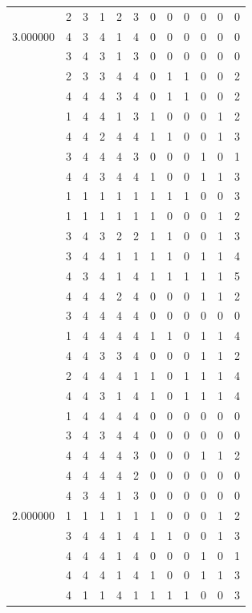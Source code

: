 \documentclass[]{book}
\theoremstyle{definition}
\theoremstyle{definition}
\theoremstyle{definition}
\theoremstyle{remark}
\begin{document}
\begin{table}
{\begin{tabular}[t]{rrrrrrrrrrrr}
 & 2 & 3 & 1 & 2 & 3 & 0 & 0 & 0 & 0 & 0 & 0\\
3.000000 & 4 & 3 & 4 & 1 & 4 & 0 & 0 & 0 & 0 & 0 & 0\\
 & 3 & 4 & 3 & 1 & 3 & 0 & 0 & 0 & 0 & 0 & 0\\
 & 2 & 3 & 3 & 4 & 4 & 0 & 1 & 1 & 0 & 0 & 2\\
 & 4 & 4 & 4 & 3 & 4 & 0 & 1 & 1 & 0 & 0 & 2\\
 & 1 & 4 & 4 & 1 & 3 & 1 & 0 & 0 & 0 & 1 & 2\\
 & 4 & 4 & 2 & 4 & 4 & 1 & 1 & 0 & 0 & 1 & 3\\
 & 3 & 4 & 4 & 4 & 3 & 0 & 0 & 0 & 1 & 0 & 1\\
 & 4 & 4 & 3 & 4 & 4 & 1 & 0 & 0 & 1 & 1 & 3\\
 & 1 & 1 & 1 & 1 & 1 & 1 & 1 & 1 & 0 & 0 & 3\\
 & 1 & 1 & 1 & 1 & 1 & 1 & 0 & 0 & 0 & 1 & 2\\
 & 3 & 4 & 3 & 2 & 2 & 1 & 1 & 0 & 0 & 1 & 3\\
 & 3 & 4 & 4 & 1 & 1 & 1 & 1 & 0 & 1 & 1 & 4\\
 & 4 & 3 & 4 & 1 & 4 & 1 & 1 & 1 & 1 & 1 & 5\\
 & 4 & 4 & 4 & 2 & 4 & 0 & 0 & 0 & 1 & 1 & 2\\
 & 3 & 4 & 4 & 4 & 4 & 0 & 0 & 0 & 0 & 0 & 0\\
 & 1 & 4 & 4 & 4 & 4 & 1 & 1 & 0 & 1 & 1 & 4\\
 & 4 & 4 & 3 & 3 & 4 & 0 & 0 & 0 & 1 & 1 & 2\\
 & 2 & 4 & 4 & 4 & 1 & 1 & 0 & 1 & 1 & 1 & 4\\
 & 4 & 4 & 3 & 1 & 4 & 1 & 0 & 1 & 1 & 1 & 4\\
 & 1 & 4 & 4 & 4 & 4 & 0 & 0 & 0 & 0 & 0 & 0\\
 & 3 & 4 & 3 & 4 & 4 & 0 & 0 & 0 & 0 & 0 & 0\\
 & 4 & 4 & 4 & 4 & 3 & 0 & 0 & 0 & 1 & 1 & 2\\
 & 4 & 4 & 4 & 4 & 2 & 0 & 0 & 0 & 0 & 0 & 0\\
 & 4 & 3 & 4 & 1 & 3 & 0 & 0 & 0 & 0 & 0 & 0\\
2.000000 & 1 & 1 & 1 & 1 & 1 & 1 & 0 & 0 & 0 & 1 & 2\\
 & 3 & 4 & 4 & 1 & 4 & 1 & 1 & 0 & 0 & 1 & 3\\
 & 4 & 4 & 4 & 1 & 4 & 0 & 0 & 0 & 1 & 0 & 1\\
 & 4 & 4 & 4 & 1 & 4 & 1 & 0 & 0 & 1 & 1 & 3\\
 & 4 & 1 & 1 & 4 & 1 & 1 & 1 & 1 & 0 & 0 & 3\\

\end{tabular}}
\end{table}
\end{document}
